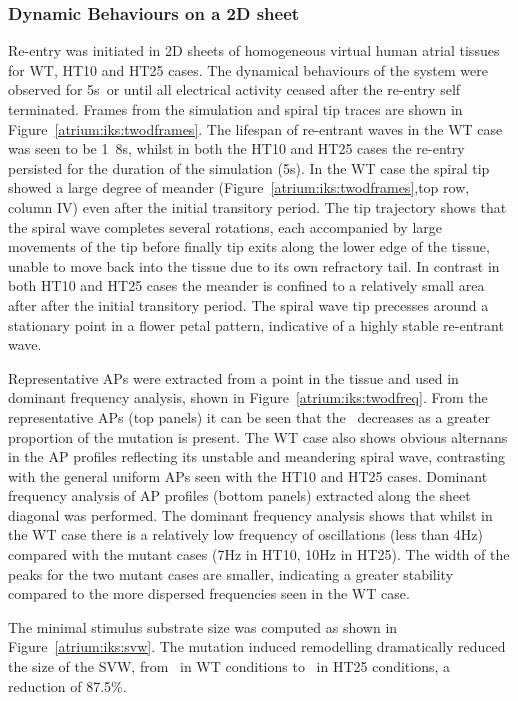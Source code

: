 \subsubsection{Dynamic Behaviours on a 2D sheet}

Re-entry was initiated in 2D sheets of homogeneous virtual human atrial tissues
for WT, HT10 and HT25 cases.
The dynamical behaviours of the system were observed for \unit{5}{s}\ or until
all electrical activity ceased after the re-entry self terminated.
Frames from the simulation and spiral tip traces are shown in
Figure~\ref{atrium:iks:twodframes}.
The lifespan of re-entrant waves in the WT case was seen to be \unit{1.8}{s},
whilst in both the HT10 and HT25 cases the re-entry persisted for the duration
of the simulation (\unit{5}{s}).
In the WT case the spiral tip showed a large degree of meander
(Figure~\ref{atrium:iks:twodframes},top row, column IV) even after the initial
transitory period.
The tip trajectory shows that the spiral wave completes several rotations, each
accompanied by large movements of the tip before finally tip exits along the
lower edge of the tissue, unable to move back into the tissue due to its own
refractory tail.
In contrast in both HT10 and HT25 cases the meander is confined to a relatively
small area after after the initial transitory period.
The spiral wave tip precesses around a stationary point in a flower petal
pattern, indicative of a highly stable re-entrant wave.

Representative APs were extracted from a point in the tissue and used in
dominant frequency analysis, shown in Figure~\ref{atrium:iks:twodfreq}.
From the representative APs (top panels) it can be seen that the \apd\ decreases
as a greater proportion of the mutation is present.
The WT case also shows obvious alternans in the AP profiles reflecting its
unstable and meandering spiral wave, contrasting with the general uniform APs
seen with the HT10 and HT25 cases.
Dominant frequency analysis of AP profiles (bottom panels) extracted along the
sheet diagonal was performed.
The dominant frequency analysis shows that whilst in the WT case there is a
relatively low frequency of oscillations (less than \unit{4}{Hz}) compared with
the mutant cases (\unit{7}{Hz} in HT10, \unit{10}{Hz} in HT25).
The width of the peaks for the two mutant cases are smaller, indicating a
greater stability compared to the more dispersed frequencies seen in the WT
case.

The minimal stimulus substrate size was computed as shown in
Figure~\ref{atrium:iks:svw}.
The mutation induced remodelling dramatically reduced the size of the SVW, from
\ in WT conditions to \ in HT25 conditions, a reduction of
87.5\%.

